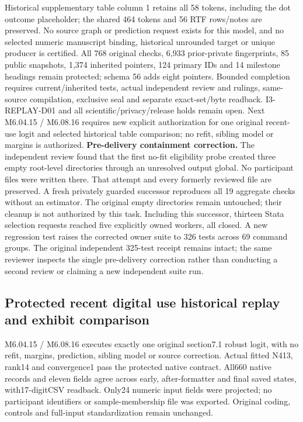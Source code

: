 \documentclass[11pt,a4paper]{article}
\begin{document}
Historical supplementary table column 1 retains all 58 tokens, including the dot outcome placeholder; the shared 464 tokens and 56 RTF rows/notes are preserved. No source graph or prediction request exists for this model, and no selected numeric manuscript binding, historical unrounded target or unique producer is certified. All 768 original checks, 6,933 prior-private fingerprints, 85 public snapshots, 1,374 inherited pointers, 124 primary IDs and 14 milestone headings remain protected; schema 56 adds eight pointers. Bounded completion requires current/inherited tests, actual independent review and rulings, same-source compilation, exclusive seal and separate exact-set/byte readback. I3-REPLAY-D01 and all scientific/privacy/release holds remain open. Next M6.04.15 / M6.08.16 requires new explicit authorization for one original recent-use logit and selected historical table comparison; no refit, sibling model or margins is authorized.
\noindent\textbf{Pre-delivery containment correction.} The independent review found that the first no-fit eligibility probe created three empty root-level directories through an unresolved output global. No participant files were written there. That attempt and every formerly reviewed file are preserved. A fresh privately guarded successor reproduces all 19 aggregate checks without an estimator. The original empty directories remain untouched; their cleanup is not authorized by this task. Including this successor, thirteen Stata selection requests reached five explicitly owned workers, all closed. A new regression test raises the corrected owner suite to 326 tests across 69 command groups. The original independent 325-test receipt remains intact; the same reviewer inspects the single pre-delivery correction rather than conducting a second review or claiming a new independent suite run.

\subsection*{Protected recent digital use historical replay and exhibit comparison}
M6.04.15 / M6.08.16 executes exactly one original section7.1 robust logit, with no refit, margins, prediction, sibling model or source correction. Actual fitted N413, rank14 and convergence1 pass the protected native contract. All660 native records and eleven fields agree across early, after-formatter and final saved states, with17-digitCSV readback. Only24 numeric input fields were projected; no participant identifiers or sample-membership file was exported. Original coding, controls and full-input standardization remain unchanged.
\end{document}
